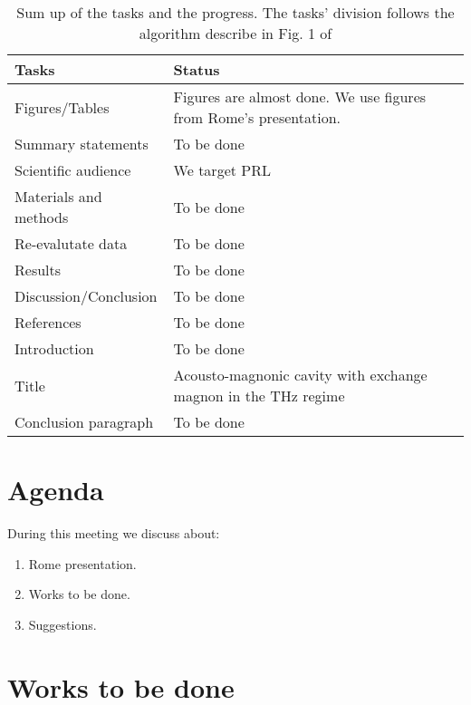 \documentclass[12pt,a4paper]{article}
\begin{document}
\begin{table}[ht]
    \centering
    \begin{tabular}{|l|l|}
    \hline
    Tasks & Status \\
    \hline
    \hline
    Figures/Tables & Figures are almost done. We use figures from Rome's presentation. \\
    \hline
    Summary statements & To be done\\
    \hline
    Scientific audience & We target PRL\\
    \hline
    Materials and methods & To be done\\
    \hline
    Re-evalutate data & To be done\\
    \hline
    Results & To be done\\
    \hline
    Discussion/Conclusion & To be done\\
    \hline
    References & To be done\\
    \hline
    Introduction & To be done\\
    \hline
    Title & Acousto-magnonic cavity with exchange magnon in the THz regime\\
    \hline
    Conclusion paragraph & To be done \\
    \hline
    \end{tabular}
    \caption{Sum up of the tasks and the progress. The tasks' division follows the algorithm describe in Fig. 1 of \cite{o2009algorithm}}
    \label{tab:my_label}
\end{table}

\section*{Agenda}

During this meeting we discuss about:
\begin{enumerate}
    \item Rome presentation.
    \item Works to be done.
    \item Suggestions.
\end{enumerate}


\section{Works to be done}
\end{document}
